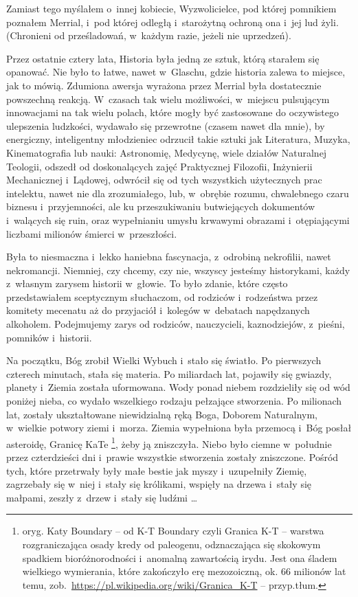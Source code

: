 \documentclass[oneside,polish,11pt,sfheadings]{mwbk}
\begin{document}
Zamiast tego myślałem o~innej kobiecie, Wyzwolicielce, pod której
pomnikiem poznałem Merrial, i~pod której odległą i~starożytną ochroną
ona i~jej lud żyli. (Chronieni od prześladowań, w~każdym razie, jeżeli
nie uprzedzeń).

Przez ostatnie cztery lata, Historia była jedną ze sztuk, którą starałem
się opanować. Nie było to łatwe, nawet w~Glaschu, gdzie historia zalewa
to miejsce, jak to mówią. Zdumiona awersja wyrażona przez Merrial była
dostatecznie powszechną reakcją. W~czasach tak wielu możliwości, w~miejscu pulsującym innowacjami na tak wielu polach, które mogły być
zastosowane do oczywistego ulepszenia ludzkości, wydawało się przewrotne
(czasem nawet dla mnie), by energiczny, inteligentny młodzieniec
odrzucił takie sztuki jak Literatura, Muzyka, Kinematografia lub nauki:
Astronomię, Medycynę, wiele działów Naturalnej Teologii, odszedł od
doskonalących zajęć Praktycznej Filozofii, Inżynierii Mechanicznej i~Lądowej, odwrócił się od tych wszystkich użytecznych prac intelektu,
nawet nie dla zrozumiałego, lub, w~obrębie rozumu, chwalebnego czaru
biznesu i~przyjemności, ale ku przeszukiwaniu butwiejących dokumentów i~walących się ruin, oraz wypełnianiu umysłu krwawymi obrazami i~otępiającymi liczbami milionów śmierci w~przeszłości.

Była to niesmaczna i~lekko haniebna fascynacja, z~odrobiną nekrofilii,
nawet nekromancji. Niemniej, czy chcemy, czy nie, wszyscy jesteśmy
historykami, każdy z~własnym zarysem historii w~głowie. To było zdanie,
które często przedstawiałem sceptycznym słuchaczom, od rodziców i~rodzeństwa przez komitety mecenatu aż do przyjaciół i~kolegów w~debatach
napędzanych alkoholem. Podejmujemy zarys od rodziców, nauczycieli,
kaznodziejów, z~pieśni, pomników i~historii.

Na początku, Bóg zrobił Wielki Wybuch i~stało się światło. Po pierwszych
czterech minutach, stała się materia. Po miliardach lat, pojawiły się
gwiazdy, planety i~Ziemia została uformowana. Wody ponad niebem
rozdzieliły się od wód poniżej nieba, co wydało wszelkiego rodzaju
pełzające stworzenia. Po milionach lat, zostały ukształtowane
niewidzialną ręką Boga, Doborem Naturalnym, w~wielkie potwory ziemi i~morza. Ziemia wypełniona była przemocą i~Bóg posłał asteroidę, Granicę
KaTe \footnote{ oryg. Katy Boundary -- od K-T Boundary czyli Granica K-T -- warstwa rozgraniczająca osady kredy od paleogenu, odznaczająca się
skokowym spadkiem bioróżnorodności i~anomalną zawartością irydu. Jest
ona śladem wielkiego wymierania, które zakończyło erę mezozoiczną, ok.
66 milionów lat temu,
zob.~\url{https://pl.wikipedia.org/wiki/Granica\_K-T} -- przyp.tłum.}, żeby ją zniszczyła. Niebo było ciemne w~południe przez
czterdzieści dni i~prawie wszystkie stworzenia zostały zniszczone.
Pośród tych, które przetrwały były małe bestie jak myszy i~uzupełniły
Ziemię, zagrzebały się w~niej i~stały się królikami, wspięły na drzewa i~stały się małpami, zeszły z~drzew i~stały się ludźmi \ldots
\end{document}

